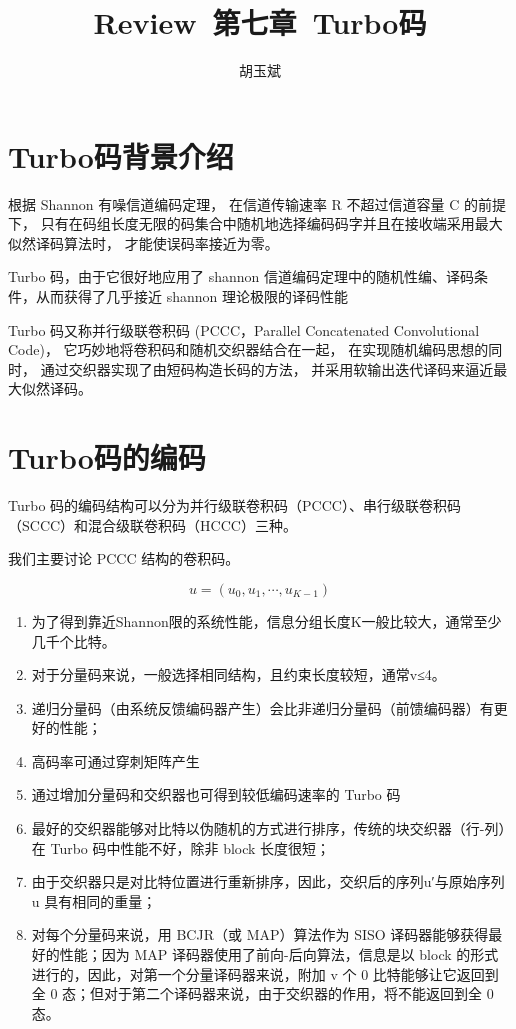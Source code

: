 \documentclass[onecolumn,oneside]{BUPTHomework}
\author{胡玉斌}
\title{Review\ 第七章\ Turbo码}
\begin{document}
  \maketitle
  
  \section*{Turbo码背景介绍}

  根据 Shannon 有噪信道编码定理，
  在信道传输速率 R 不超过信道容量 C 的前提下，
  只有在码组长度无限的码集合中随机地选择编码码字并且在接收端采用最大似然译码算法时，
  才能使误码率接近为零。

  Turbo 码，由于它很好地应用了 shannon 信道编码定理中的随机性编、译码条件，从而获得了几乎接近 shannon 理论极限的译码性能

  Turbo 码又称并行级联卷积码 (PCCC，Parallel Concatenated Convolutional Code)，
  它巧妙地将卷积码和随机交织器结合在一起，
  在实现随机编码思想的同时，
  通过交织器实现了由短码构造长码的方法，
  并采用软输出迭代译码来逼近最大似然译码。

  \section*{Turbo码的编码}

  Turbo 码的编码结构可以分为并行级联卷积码（PCCC）、串行级联卷积码（SCCC）和混合级联卷积码（HCCC）三种。

  我们主要讨论 PCCC 结构的卷积码。

  $$u=(u_0,u_1,⋯,𝑢_{𝐾−1})$$

  \begin{enumerate}
    \item 为了得到靠近Shannon限的系统性能，信息分组长度K一般比较大，通常至少几千个比特。
    \item 对于分量码来说，一般选择相同结构，且约束长度较短，通常v≤4。 
    \item 递归分量码（由系统反馈编码器产生）会比非递归分量码（前馈编码器）有更好的性能；
    \item 高码率可通过穿刺矩阵产生
    \item 通过增加分量码和交织器也可得到较低编码速率的 Turbo 码
    \item 最好的交织器能够对比特以伪随机的方式进行排序，传统的块交织器（行-列）在 Turbo 码中性能不好，除非 block 长度很短；
    \item 由于交织器只是对比特位置进行重新排序，因此，交织后的序列u′与原始序列 u 具有相同的重量；
    \item 对每个分量码来说，用 BCJR（或 MAP）算法作为 SISO 译码器能够获得最好的性能；因为 MAP 译码器使用了前向-后向算法，信息是以 block 的形式进行的，因此，对第一个分量译码器来说，附加 v 个 0 比特能够让它返回到全 0 态；但对于第二个译码器来说，由于交织器的作用，将不能返回到全 0 态。
  \end{enumerate}
\end{document}
